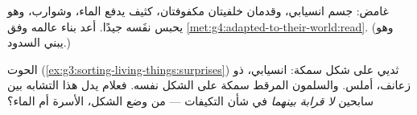 \begin{exercise}[$\star\star$]\label{exo:g4:adapted-to-their-world:10}
 غامض: جسم انسيابي، وقدمان خلفيتان مكفوفتان،  كثيف يدفع
الماء، وشوارب، وهو يحبس نفَسه جيدًا. أعد بناء عالمه وفق
\cref{met:g4:adapted-to-their-world:read}. (وهو يبني السدود.)
\end{exercise}

\begin{exercise}[$\star\star\star$]\label{exo:g4:adapted-to-their-world:11}
الحوت (\cref{ex:g3:sorting-living-things:surprises}) ثديي على شكل
سمكة: انسيابي، ذو زعانف، أملس. والسلمون المرقط سمكة على الشكل
نفسه. فعلام يدل هذا التشابه بين سابحين \emph{لا قرابة بينهما} في
شأن التكيفات --- من وضع الشكل، الأسرة أم الماء؟
\end{exercise}
